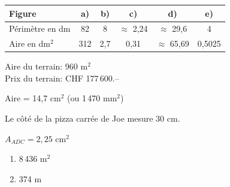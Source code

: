 \vspace{20pt}
\vspace{-5pt}
{\small
\renewcommand{\arraystretch}{1.3}
\begin{tabularx}{\textwidth}{l|*{5}{C}}
Figure & a) & b) & c) & d) & e) \\
\hline
Périmètre en dm & 82 & 8 & $\approx$ 2,24 & $\approx$ 29,6 & 4 \\
Aire en dm$^2$ & 312 & 2,7 & 0,31 & $\approx$ 65,69 & 0,5025 \\
\end{tabularx}}
 
\vspace{20pt}
\vspace{-10pt}Aire du terrain: 960 m$^2$\\
Prix du terrain: CHF 177\,600.--
 
\vspace{20pt}
\vspace{-10pt}Aire = 14,7 cm$^2$ (ou 1\,470 mm$^2$)
 
\vspace{20pt}
\vspace{-10pt}Le côté de la pizza carrée de Joe mesure 30 cm.
 
\newpage
 
\vspace{-10pt}$A_{ADC} = 2{,}25$ cm$^2$
 
\vspace{20pt}
\vspace{-15pt}\begin{enumerate}[leftmargin=*,align=parleft, label=\alph*)]
\item 8\,436 m$^2$
\item 374 m
\end{enumerate}
 

